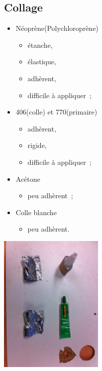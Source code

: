 \documentclass{beamer}
\begin{document}
\subsection{Collage}

\begin{frame}
  \begin{multicols}{2}
    \begin{itemize}
      \item Néoprène(Polychloroprène)
      \begin{itemize}
        \item étanche,
        \item élastique,
        \item adhèrent,
        \item difficile à appliquer~;
      \end{itemize}
      \item 406(colle) et 770(primaire)
      \begin{itemize}
        \item adhèrent,
        \item rigide,
        \item difficile à appliquer~;
      \end{itemize}
      \item Acétone
      \begin{itemize}
        \item peu adhèrent~;
      \end{itemize}
      \item Colle blanche
      \begin{itemize}
        \item peu adhèrent.
      \end{itemize}
    \end{itemize}
    \newpage
    \begin{center}
      \includegraphics[width=5cm]{../Images/colle.JPG}
    \end{center}
  \end{multicols}
\end{frame}
\end{document}
